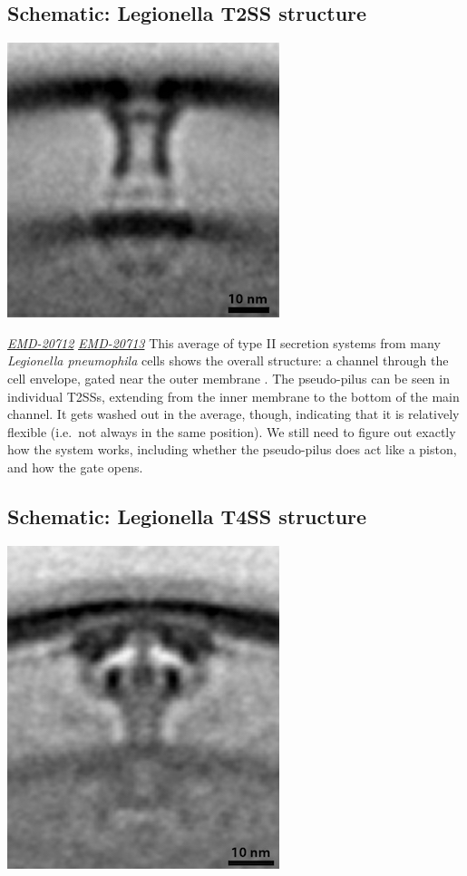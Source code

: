\documentclass[]{tufte-book}
\begin{document}
\hypertarget{Legionella_T2SS_structure}{\subsection*{Schematic:
Legionella T2SS structure}\label{Legionella_T2SS_structure}}

\includegraphics{img/schematics/9_3_1}

\href{https://www.ebi.ac.uk/pdbe/entry/emdb/EMD-20712}{\emph{EMD-20712}}
\href{https://www.ebi.ac.uk/pdbe/entry/emdb/EMD-20713}{\emph{EMD-20713}}
This average of type II secretion systems from many \emph{Legionella
pneumophila} cells shows the overall structure: a channel through the
cell envelope, gated near the outer membrane \citep{ghosal2019}. The
pseudo-pilus can be seen in individual T2SSs, extending from the inner
membrane to the bottom of the main channel. It gets washed out in the
average, though, indicating that it is relatively flexible (i.e.~not
always in the same position). We still need to figure out exactly how
the system works, including whether the pseudo-pilus does act like a
piston, and how the gate opens.

\hypertarget{Legionella_T4SS_structure}{\subsection*{Schematic:
Legionella T4SS structure}\label{Legionella_T4SS_structure}}

\includegraphics{img/schematics/9_3_2}
\end{document}
